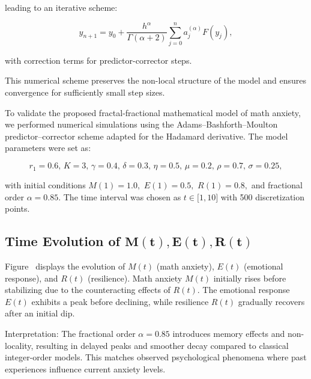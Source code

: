 \documentclass[10pt]{NSP1}
\begin{document}
leading to an iterative scheme:

\begin{equation}
y_{n + 1} = y_{0} + \frac{h^{\alpha}}{\Gamma(\alpha + 2)}\sum_{j = 0}^{n}{}a_{j}^{(\alpha)}F\left( y_{j} \right),

\end{equation}

with correction terms for predictor-corrector steps.

This numerical scheme preserves the non-local structure of the model and ensures convergence for sufficiently small step sizes.

\par\medskip{}\smallskip

To validate the proposed fractal-fractional mathematical model of math anxiety, we performed numerical simulations using the Adams–Bashforth–Moulton predictor–corrector scheme adapted for the Hadamard derivative. The model parameters were set as:

\begin{equation}
r_{1} = 0.6,\, K = 3,\,\gamma = 0.4,\,\delta = 0.3,\,\eta = 0.5,\,\mu = 0.2,\,\rho = 0.7,\,\sigma = 0.25,

\end{equation}

with initial conditions $M(1) = 1.0,\mspace{6mu} E(1) = 0.5,\mspace{6mu} R(1) = 0.8,$ and fractional order $\alpha = 0.85.$ The time interval was chosen as $t \in \lbrack 1,10\rbrack$ with 500 discretization points.

\subsection*{Time Evolution of $\mathbf{M}\left( \mathbf{t} \right)\mathbf{,E}\left( \mathbf{t} \right)\mathbf{,R}\left( \mathbf{t} \right)$}

Figure  displays the evolution of $M(t)$ (math anxiety), $E(t)$ (emotional response), and $R(t)$ (resilience). Math anxiety $M(t)$ initially rises before stabilizing due to the counteracting effects of $R(t)$. The emotional response $E(t)$ exhibits a peak before declining, while resilience $R(t)$ gradually recovers after an initial dip.

Interpretation: The fractional order $\alpha = 0.85$ introduces memory effects and non-locality, resulting in delayed peaks and smoother decay compared to classical integer-order models. This matches observed psychological phenomena where past experiences influence current anxiety levels.
\end{document}
